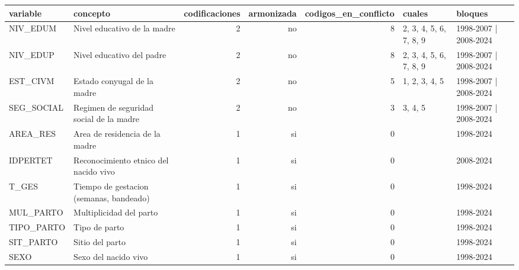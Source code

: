 \begin{tabular}{llrrrll}
\toprule
variable & concepto & codificaciones & armonizada & codigos\_en\_conflicto & cuales & bloques \\
\midrule
NIV\_EDUM & Nivel educativo de la madre & 2 & no & 8 & 2, 3, 4, 5, 6, 7, 8, 9 & 1998-2007 | 2008-2024 \\
NIV\_EDUP & Nivel educativo del padre & 2 & no & 8 & 2, 3, 4, 5, 6, 7, 8, 9 & 1998-2007 | 2008-2024 \\
EST\_CIVM & Estado conyugal de la madre & 2 & no & 5 & 1, 2, 3, 4, 5 & 1998-2007 | 2008-2024 \\
SEG\_SOCIAL & Regimen de seguridad social de la madre & 2 & no & 3 & 3, 4, 5 & 1998-2007 | 2008-2024 \\
AREA\_RES & Area de residencia de la madre & 1 & si & 0 &  & 1998-2024 \\
IDPERTET & Reconocimiento etnico del nacido vivo & 1 & si & 0 &  & 2008-2024 \\
T\_GES & Tiempo de gestacion (semanas, bandeado) & 1 & si & 0 &  & 1998-2024 \\
MUL\_PARTO & Multiplicidad del parto & 1 & si & 0 &  & 1998-2024 \\
TIPO\_PARTO & Tipo de parto & 1 & si & 0 &  & 1998-2024 \\
SIT\_PARTO & Sitio del parto & 1 & si & 0 &  & 1998-2024 \\
SEXO & Sexo del nacido vivo & 1 & si & 0 &  & 1998-2024 \\
\bottomrule
\end{tabular}
